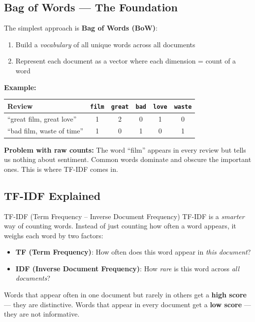 \documentclass[12pt, a4paper]{article}
\begin{document}
\subsection{Bag of Words — The Foundation}

The simplest approach is \textbf{Bag of Words (BoW)}:

\begin{enumerate}
  \item Build a \emph{vocabulary} of all unique words across all documents
  \item Represent each document as a vector where each dimension = count of a word
\end{enumerate}

\textbf{Example:}
\begin{center}
\begin{tabular}{lccccc}
\toprule
\textbf{Review} & \texttt{film} & \texttt{great} & \texttt{bad} & \texttt{love} & \texttt{waste} \\
\midrule
``great film, great love'' & 1 & 2 & 0 & 1 & 0 \\
``bad film, waste of time'' & 1 & 0 & 1 & 0 & 1 \\
\bottomrule
\end{tabular}
\end{center}

\textbf{Problem with raw counts:} The word ``film'' appears in every review but tells us nothing about sentiment. Common words dominate and obscure the important ones. This is where TF-IDF comes in.

\subsection{TF-IDF Explained}

\begin{keyterm}{TF-IDF (Term Frequency -- Inverse Document Frequency)}
TF-IDF is a \emph{smarter} way of counting words. Instead of just counting how often a word appears, it weighs each word by two factors:

\begin{itemize}
  \item \textbf{TF (Term Frequency)}: How often does this word appear in \emph{this document}?
  \item \textbf{IDF (Inverse Document Frequency)}: How \emph{rare} is this word across \emph{all documents}?
\end{itemize}

Words that appear often in one document but rarely in others get a \textbf{high score} — they are distinctive. Words that appear in every document get a \textbf{low score} — they are not informative.
\end{keyterm}
\end{document}
